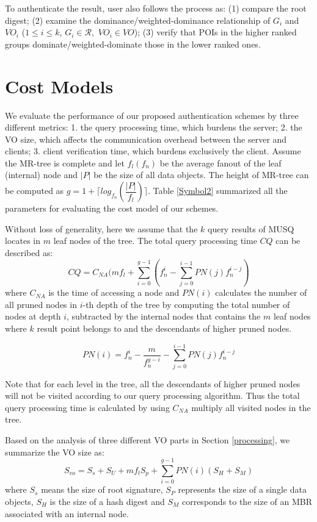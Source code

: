 \documentclass[10pt, conference, compsocconf]{IEEEtran}
\begin{document}
To authenticate the result, user also follows the process as: (1) compare the root digest; (2) examine the dominance/weighted-dominance relationship of $G_i$ and $VO_i$ ($1\leq i\leq k$, $G_i \in \mathcal{R}, $ $VO_i \in VO$); (3) verify that POIs in the higher ranked groups dominate/weighted-dominate those in the lower ranked ones.


\section{Cost Models}

We evaluate the performance of our proposed authentication schemes by three different metrics: 1. the query processing time, which burdens the server; 2. the VO size, which affects the communication overhead between the server and clients; 3. client verification time, which burdens exclusively the client. Assume the MR-tree is complete and let $f_l(f_n)$ be the average fanout of the leaf (internal) node and $|P|$ be the size of all data objects. The height of MR-tree can be computed as $g = 1+\lceil log_{f_n}(\dfrac{|P|}{f_l}) \rceil $. Table \ref{Symbol2} summarized all the parameters for evaluating the cost model of our schemes.

Without loss of generality, here we assume that the $k$ query results of MUSQ locates in ${m}$ leaf nodes of the tree. The total query processing time $CQ$ can be described as:
\begin{equation*}
CQ = C_{NA}(mf_l + \sum\limits_{i=0}^{g-1}(f_n^i - \sum\limits_{j=0}^{i-1}PN(j)f_n^{i-j})
\end{equation*}
where $C_{NA}$ is the time of accessing a node and $PN(i)$ calculates the number of all pruned nodes in $i$-th depth of the tree by computing the total number of nodes at depth $i$, subtracted by the internal nodes that contains the $m$ leaf nodes where $k$ result point belongs to and the descendants of higher pruned nodes.

\begin{equation*}
PN(i) = f_n^i - \dfrac{m}{f_n^{g-i}} - \sum\limits_{j=0}^{i-1}PN(j)f_n^{i-j}
\end{equation*}

Note that for each level in the tree, all the descendants of higher pruned nodes will not be visited according to our query processing algorithm. Thus the total query processing time is calculated by using $C_{NA}$ multiply all visited nodes in the tree.

Based on the analysis of three different VO parts in Section \ref{processing}, we summarize the VO size as:
\begin{equation*}
S_{vo} = S_s + S_U + mf_lS_p + \sum\limits_{i=0}^{g-1}PN(i)(S_H + S_M)
\end{equation*}
where $S_s$ means the size of root signature, $S_P$ represents the size of a single data objects, $S_H$ is the size of a hash digest and $S_M$ corresponds to the size of an MBR associated with an internal node.
\end{document}
